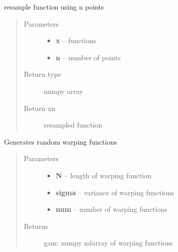 \documentclass[letterpaper,10pt,english]{sphinxmanual}
\begin{document}

\begin{fulllineitems}
\label{utility_functions:utility_functions.resamplefunction}
resample function using n points
\begin{quote}\begin{description}
\item[{Parameters}] \leavevmode\begin{itemize}
\item {} 
\textbf{x} -- functions

\item {} 
\textbf{n} -- number of points

\end{itemize}

\item[{Return type}] \leavevmode
numpy array

\item[{Return xn}] \leavevmode
resampled function

\end{description}\end{quote}

\end{fulllineitems}


\begin{fulllineitems}
\label{utility_functions:utility_functions.rgam}
Generates random warping functions
\begin{quote}\begin{description}
\item[{Parameters}] \leavevmode\begin{itemize}
\item {} 
\textbf{N} -- length of warping function

\item {} 
\textbf{sigma} -- variance of warping functions

\item {} 
\textbf{num} -- number of warping functions

\end{itemize}

\item[{Returns}] \leavevmode
gam: numpy ndarray of warping functions

\end{description}\end{quote}

\end{fulllineitems}
\end{document}
